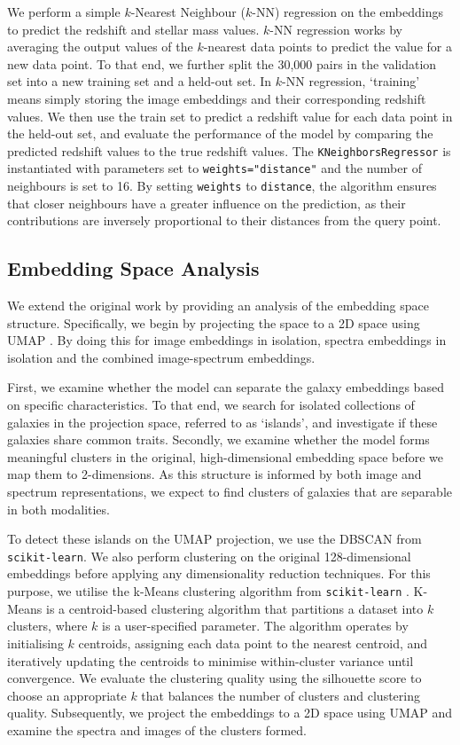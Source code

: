 \documentclass[a4paper,12pt]{article}
\begin{document}
We perform a simple $k$-Nearest Neighbour ($k$-NN) regression on the embeddings to predict the redshift and stellar mass values. $k$-NN regression works by averaging the output values of the $k$-nearest data points to predict the value for a new data point. To that end, we further split the 30,000 pairs in the validation set into a new training set and a held-out set. In $k$-NN regression, `training' means simply storing the image embeddings and their corresponding redshift values. We then use the train set to predict a redshift value for each data point in the held-out set, and evaluate the performance of the model by comparing the predicted redshift values to the true redshift values. The \verb|KNeighborsRegressor| is instantiated with parameters set to \verb|weights="distance"| and the number of neighbours is set to 16. By setting \verb|weights| to \verb|distance|, the algorithm ensures that closer neighbours have a greater influence on the prediction, as their contributions are inversely proportional to their distances from the query point.


\subsection{Embedding Space Analysis}
We extend the original work by providing an analysis of the embedding space structure. Specifically, we begin by projecting the space to a 2D space using UMAP \cite{UMAP}.
By doing this for image embeddings in isolation, spectra embeddings in isolation and the combined image-spectrum embeddings.

First, we examine whether the model can separate the galaxy embeddings based on specific characteristics. To that end, we search for isolated collections of galaxies in the projection space, referred to as `islands', and investigate if these galaxies share common traits. Secondly, we examine whether the model forms meaningful clusters in the original, high-dimensional embedding space before we map them to 2-dimensions. As this structure is informed by both image and spectrum representations, we expect to find clusters of galaxies that are separable in both modalities.

To detect these islands on the UMAP projection, we use the DBSCAN from \verb|scikit-learn|. 
We also perform clustering on the original 128-dimensional embeddings before applying any dimensionality reduction techniques. For this purpose, we utilise the k-Means clustering  algorithm \cite{udl} from \verb|scikit-learn| . K-Means is a centroid-based clustering algorithm that partitions a dataset into \( k \) clusters, where \( k \) is a user-specified parameter. The algorithm operates by initialising \( k \) centroids, assigning each data point to the nearest centroid, and iteratively updating the centroids to minimise within-cluster variance until convergence. We evaluate the clustering quality using the silhouette score \cite{silhouette} to choose an appropriate \( k \) that balances the number of clusters and clustering quality. Subsequently, we project the embeddings to a 2D space using UMAP and examine the spectra and images of the clusters formed.
\end{document}
